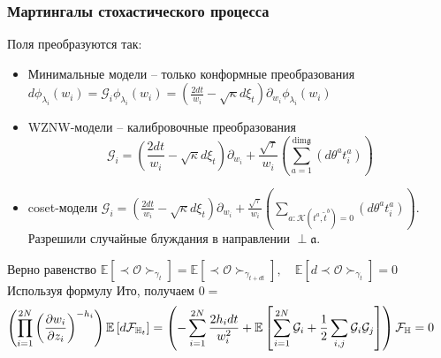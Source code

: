 \documentclass[pdftex]{beamer}
\newcommand{\gf}{\mathfrak{g}}
\newcommand{\af}{\mathfrak{a}}
\theoremstyle{definition} \newtheorem{Def}{Определение}
\begin{document}
\begin{frame}
  \frametitle{Мартингалы стохастического процесса}
   Поля преобразуются так:
   \begin{itemize}
   \item   Минимальные модели -- только конформные преобразования
     $d\phi_{\lambda_{i}}(w_{i}) = \mathcal{G}_{i}\phi_{\lambda_{i}}(w_{i})=\left(\frac{2dt}{w_{i}}-\sqrt{\kappa} d\xi_{t}\right) \partial_{w_{i}}\phi_{\lambda_{i}}(w_{i})$
   \item WZNW-модели -- калибровочные преобразования
  \begin{equation*}
    \mathcal{G}_{i}=\left(\frac{2dt}{w_{i}}-\sqrt{\kappa} d\xi_{t}\right) \partial_{w_{i}}+\frac{\sqrt{\tau}}{w_{i}}\left(\sum_{a=1}^{\mathrm{dim} \gf}\left(d \theta ^{a} t^{a}_{i}\right)\right)
  \end{equation*}
\item coset-модели $\mathcal{G}_{i}=\left(\frac{2dt}{w_{i}}-\sqrt{\kappa} d\xi_{t}\right) \partial_{w_{i}}+\frac{\sqrt{\tau}}{w_{i}}\left(\sum_{a:\mathcal{K}(t^{a},\tilde{t}^{b})=0}\left(d \theta ^{a} t^{a}_{i}\right)\right)$.
Разрешили случайные блуждания в направлении $\perp \af$.
   \end{itemize}

  Верно равенство
$    \mathbb{E}\left[\prec\mathcal{O}\succ_{\gamma_{t}}\right]=    \mathbb{E}\left[\prec\mathcal{O}\succ_{\gamma_{t+dt}}\right], \quad \mathbb{E}\left[d \prec\mathcal{O}\succ_{\gamma_{t}}\right]=0
$
  Используя формулу Ито, получаем $0 =$
  \begin{multline}
    \hspace{-0.5cm}
    \left(\prod_{i=1}^{2N}\left(\frac{\partial w_{i}}{\partial z_{i}}\right)^{-h_{i}}\right)\mathbb{E}\left[d 
      \mathcal{F}_{\mathbb{H}_{t}}\right]=
    \left(-\sum_{i=1}^{2N}\frac{2h_{i}dt}{w_{i}^{2}}+\mathbb{E}\left[\sum_{i=1}^{2N}\mathcal{G}_{i}+\frac{1}{2}
        \sum_{i,j}\mathcal{G}_{i}\mathcal{G}_{j}\right]\right)\mathcal{F}_{\mathbb{H}} = 0
  \end{multline}
\end{frame}
\end{document}
